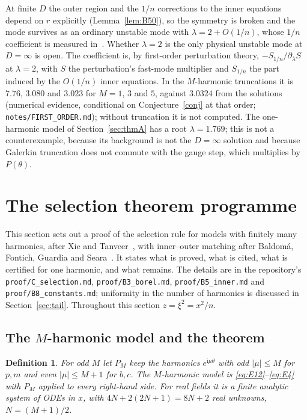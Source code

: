 \documentclass{amsart}
\numberwithin{equation}{section}
\theoremstyle{plain}
\newtheorem{definition}{Definition}[section]
\theoremstyle{definition}
\theoremstyle{remark}
\newcommand{\iu}{\mathrm{i}}
\newcommand{\repo}[1]{\texttt{#1}}
\begin{document}
At finite $D$ the outer region and the $1/n$ corrections to the inner equations depend on $r$ explicitly
(Lemma~\ref{lem:B50}), so the symmetry is broken and the mode survives as an ordinary unstable mode with
$\lambda = 2 + O(1/n)$, whose $1/n$ coefficient is measured in~\cite{companion}. Whether $\lambda = 2$ is the only
physical unstable mode at $D = \infty$ is open. The coefficient is, by first-order perturbation theory,
$-S_{1/n}/\partial_\lambda S$ at $\lambda = 2$, with $S$ the perturbation's fast-mode multiplier and $S_{1/n}$ the part induced
by the $O(1/n)$ inner equations. In the $M$-harmonic truncations it is $7.76$, $3.080$ and $3.023$ for $M = 1$, $3$ and $5$,
against $3.0324$ from the solutions (numerical evidence, conditional on Conjecture~\ref{conj} at that order;
\repo{notes/FIRST\_ORDER.md}); without truncation it is not computed. The one-harmonic model of Section~\ref{sec:thmA}
has a root $\lambda = 1.769$; this is not a
counterexample, because its background is not the $D = \infty$ solution and because Galerkin truncation does not commute
with the gauge step, which multiplies by $P(\theta)$.

\section{The selection theorem programme}
\label{sec:layerB}

This section sets out a proof of the selection rule for models with finitely many harmonics, after Xie and
Tanveer~\cite{XieTanveer2003,Xie2019}, with inner--outer matching after Baldom\'a, Fontich, Guardia and
Seara~\cite{BaldomaFontichGuardiaSeara}. It states what is proved, what is cited, what is certified for one harmonic, and
what remains. The details are in the repository's \repo{proof/C\_selection.md}, \repo{proof/B3\_borel.md},
\repo{proof/B5\_inner.md} and \repo{proof/B8\_constants.md}; uniformity in the number of harmonics is
discussed in Section~\ref{sec:tail}. Throughout this section $z = \xi^2 = x^2/n$.

\subsection{The \texorpdfstring{$M$}{M}-harmonic model and the theorem}

\begin{definition}\label{def:Mmodel}
For odd $M$ let $P_M$ keep the harmonics $e^{\iu\mu\theta}$ with odd $|\mu| \le M$ for $p, m$ and even $|\mu| \le M + 1$ for
$b, c$. The \emph{$M$-harmonic model} is \eqref{eq:E12}--\eqref{eq:E4} with $P_M$ applied to every right-hand side. For
real fields it is a finite analytic system of ODEs in $x$, with $4N + 2(2N+1) = 8N + 2$ real unknowns, $N = (M+1)/2$.
\end{definition}
\end{document}

